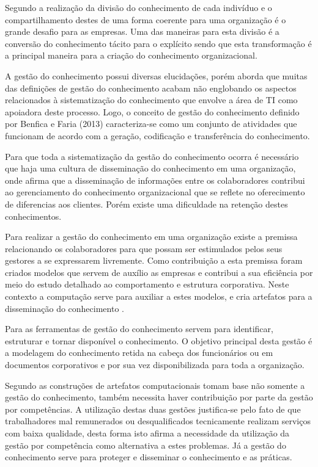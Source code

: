 Segundo  a realização da divisão do conhecimento de cada indivíduo e o compartilhamento destes de uma forma coerente para uma organização é o grande desafio para as empresas. Uma das maneiras para esta divisão é a conversão do conhecimento tácito para o explícito sendo que esta transformação é a principal maneira para a criação do conhecimento organizacional.

A gestão do conhecimento possui diversas elucidações, porém  aborda que muitas das definições de gestão do conhecimento acabam não englobando os aspectos relacionados à sistematização do conhecimento que envolve a área de TI como apoiadora deste processo. Logo, o conceito de gestão do conhecimento definido por Benfica e Faria (2013) caracteriza-se como um conjunto de atividades que funcionam de acordo com a geração, codificação e transferência do conhecimento.

Para que toda a sistematização da gestão do conhecimento ocorra é necessário que haja uma cultura de disseminação do conhecimento em uma organização, onde  afirma que a disseminação de informações entre os colaboradores contribui ao gerenciamento do conhecimento organizacional que se reflete no oferecimento de diferencias aos clientes. Porém existe uma dificuldade na retenção destes conhecimentos.

Para realizar a gestão do conhecimento em uma organização existe a premissa relacionando os colaboradores para que possam ser estimulados pelos seus gestores a se expressarem livremente. Como contribuição a esta premissa foram criados modelos que servem de auxílio as empresas e contribui a sua eficiência por meio do estudo detalhado ao comportamento e estrutura corporativa. Neste contexto a computação serve para auxiliar a estes modelos, e cria artefatos para a disseminação do conhecimento \cite{Trainotti2014}.

Para  as ferramentas de gestão do conhecimento servem para identificar, estruturar e tornar disponível o conhecimento. O objetivo principal desta gestão é a modelagem do conhecimento retida na cabeça dos funcionários ou em documentos corporativos e por sua vez disponibilizada para toda a organização.

Segundo  as construções de artefatos computacionais tomam base não somente a gestão do conhecimento, também necessita haver contribuição por parte da gestão por competências. A utilização destas duas gestões justifica-se pelo fato de que trabalhadores mal remunerados ou desqualificados tecnicamente realizam serviços com baixa qualidade, desta forma isto afirma a necessidade da utilização da gestão por competência como alternativa a estes problemas. Já a gestão do conhecimento serve para proteger e disseminar o conhecimento e as práticas.


